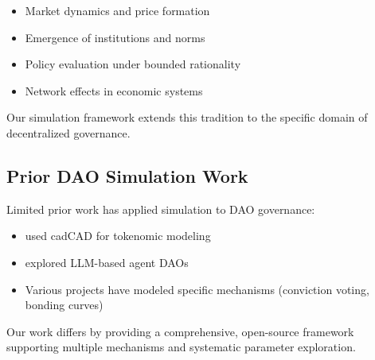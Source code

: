 \begin{itemize}
    \item Market dynamics and price formation
    \item Emergence of institutions and norms
    \item Policy evaluation under bounded rationality
    \item Network effects in economic systems
\end{itemize}

Our simulation framework extends this tradition to the specific domain of decentralized governance.

\subsection{Prior DAO Simulation Work}

Limited prior work has applied simulation to DAO governance:

\begin{itemize}
    \item \citet{faqir2021cadcad} used cadCAD for tokenomic modeling
    \item \citet{tan2023agentdao} explored LLM-based agent DAOs
    \item Various projects have modeled specific mechanisms (conviction voting, bonding curves)
\end{itemize}

Our work differs by providing a comprehensive, open-source framework supporting multiple mechanisms and systematic parameter exploration.
